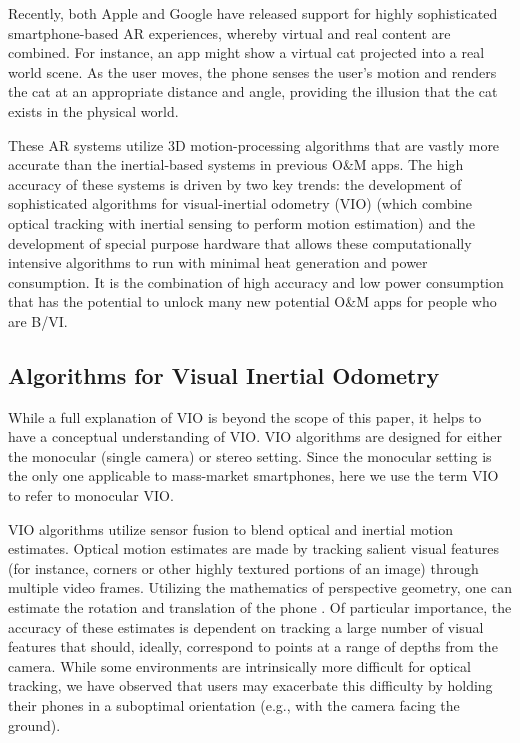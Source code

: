\documentclass[chi_draft]{sigchi}
\newcommand{\BVI}{B/VI\xspace}
\newcommand{\OM}{O\&M\xspace}
\begin{document}
Recently, both Apple and Google have released support for highly sophisticated smartphone-based AR experiences, whereby virtual and real content are combined.  For instance, an app might show a virtual cat projected into a real world scene.  As the user moves, the phone senses the user's motion and renders the cat at an appropriate distance and angle, providing the illusion that the cat exists in the physical world.

These AR systems utilize 3D motion-processing algorithms that are vastly more accurate than the inertial-based systems in previous \OM apps.  The high accuracy of these systems is driven by two key trends: the development of sophisticated algorithms for visual-inertial odometry (VIO) \cite{li2013high,leutenegger2015keyframe,bloesch2015robust,forster2014svo} (which combine optical tracking with inertial sensing to perform motion estimation) and the development of special purpose hardware that allows these computationally intensive algorithms to run with minimal heat generation and power consumption.  It is the combination of high accuracy and low power consumption that has the potential to unlock many new potential \OM apps for people who are \BVI.

\subsection{Algorithms for Visual Inertial Odometry}
While a full explanation of VIO \cite{gui2015review} is beyond the scope of this paper, it helps to have a conceptual understanding of VIO.  VIO algorithms are designed for either the monocular (single camera) or stereo setting.  Since the monocular setting is the only one applicable to mass-market smartphones, here we use the term VIO to refer to monocular VIO.

VIO algorithms utilize sensor fusion to blend optical and inertial motion estimates.  Optical motion estimates are made by tracking salient visual features (for instance, corners or other highly textured portions of an image) through multiple video frames.  Utilizing the mathematics of perspective geometry, one can estimate the rotation and translation of the phone \cite{Hartley2004}.  Of particular importance, the accuracy of these estimates is dependent on tracking a large number of visual features that should, ideally, correspond to points at a range of depths from the camera.  While some environments are intrinsically more difficult for optical tracking, we have observed that users may exacerbate this difficulty by holding their phones in a suboptimal orientation (e.g., with the camera facing the ground).
\end{document}
